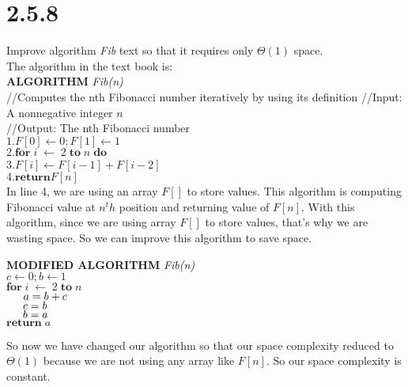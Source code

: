 \documentclass[8pt, letterpaper]{article}
\begin{document}
\section{2.5.8}
\indent Improve algorithm \textit{Fib} text so that it requires only $\Theta(1)$ space. \\
The algorithm in the text book is: \\
\textbf{ALGORITHM} \textit{Fib(n)} \\
\indent //Computes the nth Fibonacci number iteratively by using its definition
\indent //Input: A nonnegative integer $n$ \\
\indent //Output: The nth Fibonacci number \\
\indent $1. F[0] \leftarrow 0; F[1] \leftarrow 1$ \\
\indent $2. \textbf{for}\; i \; \leftarrow \; 2 \; \textbf{to} \; n \; \textbf{do}$ \\
\indent $3$.\indent $F[i] \leftarrow F[i-1] + F[i-2]$ \\
\indent $4. \textbf{return} F[n]$ \\
In line 4, we are using an array $F[]$ to store values. This algorithm is computing Fibonacci value at $n^th$ position and returning value of $F[n]$.
With this algorithm, since we are using array $F[]$ to store values, that's why we are wasting space. So we can improve this algorithm to save space.

\textbf{MODIFIED ALGORITHM} \textit{Fib(n)} \\
\indent $c \leftarrow 0; b \leftarrow 1$ \\
\indent $\textbf{for}\; i \; \leftarrow \; 2 \; \textbf{to} \; n$ \\
\indent $\indent a = b+c$ \\
\indent $\indent c=b$ \\
\indent $\indent b=a$ \\
\indent $\textbf{return} \; a$

So now we have changed our algorithm so that our space complexity reduced to $\Theta(1)$ because we are not using any array like $F[n]$. So our space complexity is constant. 
\end{document}
